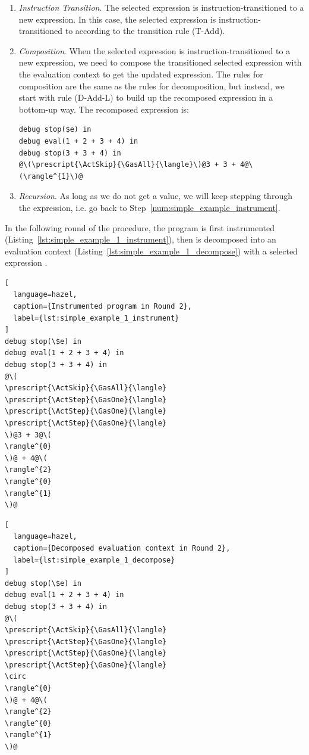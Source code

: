 \begin{enumerate}
\item \emph{Instruction Transition}. The selected expression is
  instruction-transitioned to a new expression. In this case, the selected
  expression  is
  instruction-transitioned to  according
  to the transition rule (T-Add).

\item \emph{Composition}. When the selected expression is
  instruction-transitioned to a new expression, we need to compose the
  transitioned selected expression with the evaluation context to get the
  updated expression. The rules for composition are the same as the
  rules for decomposition, but instead, we start with rule (D-Add-L)
  to build up the recomposed expression in a bottom-up way. The
  recomposed expression is:
  \begin{lstlisting}[language=hazel]
debug stop($e) in
debug eval(1 + 2 + 3 + 4) in
debug stop(3 + 3 + 4) in
@\(\prescript{\ActSkip}{\GasAll}{\langle}\)@3 + 3 + 4@\(\rangle^{1}\)@\end{lstlisting}

\item \emph{Recursion}. As long as we do not get a value, we will keep
  stepping through the expression, i.e. go back to
  Step~\ref{num:simple_example_instrument}.
\end{enumerate}

In the following round of the procedure, the program is first
instrumented (Listing~\ref{lst:simple_example_1_instrument}), then is
decomposed into an evaluation context
(Listing~\ref{lst:simple_example_1_decompose}) with a selected
expression .

\begin{lstlisting}[
  language=hazel,
  caption={Instrumented program in Round 2},
  label={lst:simple_example_1_instrument}
]
debug stop(\$e) in
debug eval(1 + 2 + 3 + 4) in
debug stop(3 + 3 + 4) in
@\(
\prescript{\ActSkip}{\GasAll}{\langle}
\prescript{\ActStep}{\GasOne}{\langle}
\prescript{\ActStep}{\GasOne}{\langle}
\prescript{\ActStep}{\GasOne}{\langle}
\)@3 + 3@\(
\rangle^{0}
\)@ + 4@\(
\rangle^{2}
\rangle^{0}
\rangle^{1}
\)@\end{lstlisting}

\begin{lstlisting}[
  language=hazel,
  caption={Decomposed evaluation context in Round 2},
  label={lst:simple_example_1_decompose}
]
debug stop(\$e) in
debug eval(1 + 2 + 3 + 4) in
debug stop(3 + 3 + 4) in
@\(
\prescript{\ActSkip}{\GasAll}{\langle}
\prescript{\ActStep}{\GasOne}{\langle}
\prescript{\ActStep}{\GasOne}{\langle}
\prescript{\ActStep}{\GasOne}{\langle}
\circ
\rangle^{0}
\)@ + 4@\(
\rangle^{2}
\rangle^{0}
\rangle^{1}
\)@\end{lstlisting}

